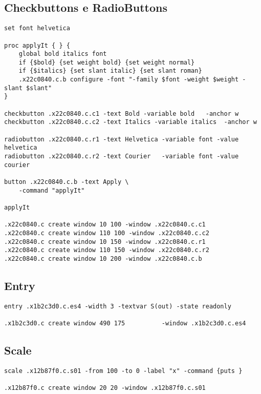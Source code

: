 \subsection{Checkbuttons e RadioButtons}

\begin{lstlisting}
set font helvetica

proc applyIt { } {
    global bold italics font
    if {$bold} {set weight bold} {set weight normal}
    if {$italics} {set slant italic} {set slant roman}
    .x22c0840.c.b configure -font "-family $font -weight $weight -slant $slant"
}

checkbutton .x22c0840.c.c1 -text Bold -variable bold   -anchor w
checkbutton .x22c0840.c.c2 -text Italics -variable italics  -anchor w

radiobutton .x22c0840.c.r1 -text Helvetica -variable font -value helvetica
radiobutton .x22c0840.c.r2 -text Courier   -variable font -value courier   

button .x22c0840.c.b -text Apply \
    -command "applyIt"

applyIt

.x22c0840.c create window 10 100 -window .x22c0840.c.c1
.x22c0840.c create window 110 100 -window .x22c0840.c.c2
.x22c0840.c create window 10 150 -window .x22c0840.c.r1
.x22c0840.c create window 110 150 -window .x22c0840.c.r2
.x22c0840.c create window 10 200 -window .x22c0840.c.b

\end{lstlisting}

\subsection{Entry}

\begin{lstlisting}
entry .x1b2c3d0.c.es4 -width 3 -textvar S(out) -state readonly

.x1b2c3d0.c create window 490 175          -window .x1b2c3d0.c.es4
\end{lstlisting}

\subsection{Scale}
\begin{lstlisting}
scale .x12b87f0.c.s01 -from 100 -to 0 -label "x" -command {puts }

.x12b87f0.c create window 20 20 -window .x12b87f0.c.s01
\end{lstlisting}

